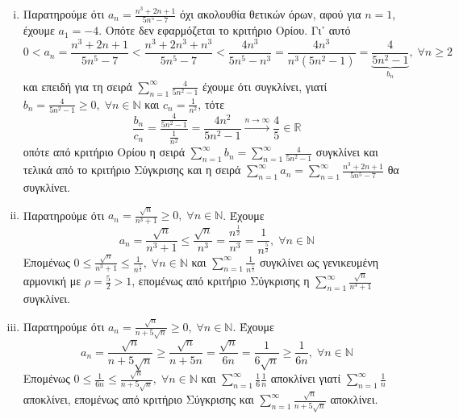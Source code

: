 \begin{enumerate}
\begin{enumerate}[i)]
      \item Παρατηρούμε ότι $ a_{n}= \frac{n^{3}+2n+1}{5n^{5}-7} $ όχι 
        ακολουθία θετικών όρων, αφού για $ n=1 $, έχουμε $ a_{1}=-4$. Οπότε δεν 
        εφαρμόζεται το κριτήριο Ορίου. Γι᾽ αυτό
        \[
          0 < a_{n}= \frac{n^{3}+2n+1}{5n^{5}-7} < 
          \frac{n^{3}+2n^{3}+n^{3}}{5n^{5}-7} < \frac{4n^{3}}{5n^{5}-n^{3}} = 
          \frac{4n^{3}}{n^{3}(5n^{2}-1)} = \underbrace{\frac{4}{5n^{2}-1}}_
          {b_{n}}, \; \forall n \geq 2
        \] 
        και επειδή για τη σειρά $ \sum_{n=1}^{\infty} \frac{4}{5n^{2}-1} $ 
        έχουμε ότι συγκλίνει, γιατί 
        $
        b_{n} = \frac{4}{5n^{2}-1} \geq 0, \; \forall n \in \mathbb{N}
        $ 
        και $ c_{n} = \frac{1}{n^{2}} $, τότε
        \[
          \frac{b_{n}}{c_{n}} = \frac{\frac{4}{5n^{2}-1}}{\frac{1}{n^{2}}} = 
          \frac{4n^{2}}{5n^{2}-1} \xrightarrow{n \to \infty} \frac{4}{5} 
          \in \mathbb{R} 
        \]
        οπότε από κριτήριο Ορίου η σειρά $ \sum_{n=1}^{\infty} b_{n}= 
        \sum_{n=1}^{\infty} \frac{4}{5n^{2}-1}$ συγκλίνει και τελικά 
        από το κριτήριο Σύγκρισης
        και η σειρά $ \sum_{n=1}^{\infty} a_{n} = \sum_{n=1}^{\infty}
        \frac{n^{3}+2n+1}{5n^{5}-7} $ θα συγκλίνει.


      \item Παρατηρούμε ότι $ a_{n} = \frac{\sqrt{n}}{n^{3}+1} \geq 0, \; 
        \forall n \in \mathbb{N} $. Έχουμε
        \[
          a_{n} = \frac{\sqrt{n}}{n^{3}+1} \leq \frac{\sqrt{n}}{n^{3}} =
          \frac{n^{\frac{1}{2}}}{n^{3}} = \frac{1}{n^{\frac{5}{2}}}, \; 
          \forall n \in \mathbb{N}
        \] 
        Επομένως $ 0 \leq \frac{\sqrt{n}}{n^{3}+1} \leq \frac{1}{n^{\frac{5}{2}}}, 
        \; \forall n \in \mathbb{N}$ και $ \sum_{n=1}^{\infty} 
        \frac{1}{n^{\frac{5}{2} }}$ συγκλίνει ως γενικευμένη αρμονική με 
        $ \rho = \frac{5}{2} > 1 $, επομένως από κριτήριο Σύγκρισης η 
        $ \sum_{n=1}^{\infty} \frac{\sqrt{n}}{n^{3}+1} $ συγκλίνει.

      \item Παρατηρούμε ότι $ a_{n} = \frac{\sqrt{n}}{n + 5 \sqrt{n}} \geq 0, \; 
        \forall n \in \mathbb{N}$. Έχουμε
        \[
          a_{n} = \frac{\sqrt{n}}{n+ 5 \sqrt{n}} \geq \frac{\sqrt{n}}{n+ 5n} = 
          \frac{\sqrt{n}}{6n} = \frac{1}{6 \sqrt{n}} \geq \frac{1}{6n}, 
          \; \forall n \in \mathbb{N}
        \] 
        Επομένως $ 0 \leq \frac{1}{6n} \leq \frac{\sqrt{n}}{n+ 5 \sqrt{n}}, \; 
        \forall n \in \mathbb{N} $ και 
        $ \sum_{n=1}^{\infty} \frac{1}{6} \frac{1}{n} $ αποκλίνει γιατί 
        $ \sum_{n=1}^{\infty} \frac{1}{n} $ αποκλίνει, επομένως από κριτήριο 
        Σύγκρισης και $ \sum_{n=1}^{\infty} \frac{\sqrt{n}}{n+ 5 \sqrt{n}} $ 
        αποκλίνει.


\end{enumerate}
\end{enumerate}
